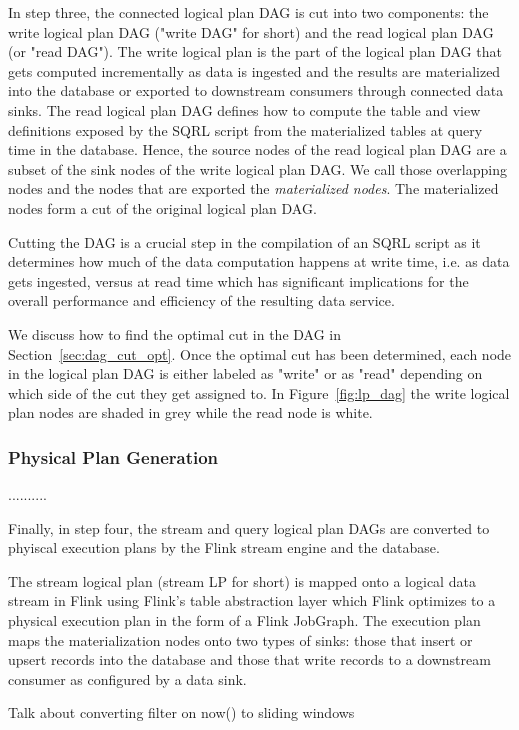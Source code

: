 \documentclass[	DIV=calc,%
							paper=letter,%
							fontsize=11pt,%
							twocolumn]{scrartcl}	 					%
\begin{document}
In step three, the connected logical plan DAG is cut into two components: the write logical plan DAG ("write DAG" for short) and the read logical plan DAG (or "read DAG"). The write logical plan is the part of the logical plan DAG that gets computed incrementally as data is ingested and the results are materialized into the database or exported to downstream consumers through connected data sinks. The read logical plan DAG defines how to compute the table and view definitions exposed by the SQRL script from the materialized tables at query time in the database.
Hence, the source nodes of the read logical plan DAG are a subset of the sink nodes of the write logical plan DAG. We call those overlapping nodes and the nodes that are exported the \emph{materialized nodes}. The materialized nodes form a cut of the original logical plan DAG.

Cutting the DAG is a crucial step in the compilation of an SQRL script as it determines how much of the data computation happens at write time, i.e. as data gets ingested, versus at read time which has significant implications for the overall performance and efficiency of the resulting data service.

We discuss how to find the optimal cut in the DAG in Section~\ref{sec:dag_cut_opt}. Once the optimal cut has been determined, each node in the logical plan DAG is either labeled as "write" or as "read" depending on which side of the cut they get assigned to. In Figure~\ref{fig:lp_dag} the write logical plan nodes are shaded in grey while the read node is white.

\subsubsection{Physical Plan Generation}

..........


Finally, in step four, the stream and query logical plan DAGs are converted to phyiscal execution plans by the Flink stream engine and the database.

The stream logical plan (stream LP for short) is mapped onto a logical data stream in Flink using Flink's table abstraction layer which Flink optimizes to a physical execution plan in the form of a Flink JobGraph. The execution plan maps the materialization nodes onto two types of sinks: those that insert or upsert records into the database and those that write records to a downstream consumer as configured by a data sink.

Talk about converting filter on now() to sliding windows
\end{document}
